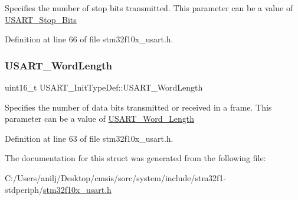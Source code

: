 Specifies the number of stop bits transmitted. This parameter can be a value of \hyperlink{group___u_s_a_r_t___stop___bits}{U\+S\+A\+R\+T\+\_\+\+Stop\+\_\+\+Bits} 

Definition at line 66 of file stm32f10x\+\_\+usart.\+h.

\mbox{\label{struct_u_s_a_r_t___init_type_def_a16d1fb7ccc2b51964f1bcfcbfba6d89d}} 
\subsubsection{\texorpdfstring{U\+S\+A\+R\+T\+\_\+\+Word\+Length}{USART\_WordLength}}
{\footnotesize\ttfamily uint16\+\_\+t U\+S\+A\+R\+T\+\_\+\+Init\+Type\+Def\+::\+U\+S\+A\+R\+T\+\_\+\+Word\+Length}

Specifies the number of data bits transmitted or received in a frame. This parameter can be a value of \hyperlink{group___u_s_a_r_t___word___length}{U\+S\+A\+R\+T\+\_\+\+Word\+\_\+\+Length} 

Definition at line 63 of file stm32f10x\+\_\+usart.\+h.



The documentation for this struct was generated from the following file\+:\begin{DoxyCompactItemize}
\item 
C\+:/\+Users/anilj/\+Desktop/cmsis/sorc/system/include/stm32f1-\/stdperiph/\hyperlink{stm32f10x__usart_8h}{stm32f10x\+\_\+usart.\+h}\end{DoxyCompactItemize}
